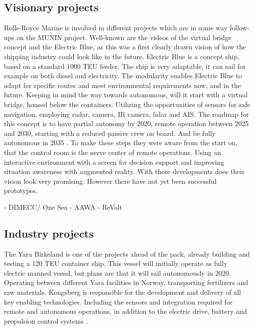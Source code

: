 \subsection{Visionary projects}
Rolls-Royce Marine is involved in different projects which are in some way follow-ups on the MUNIN project. Well-known are the videos of the virtual bridge concept and the Electric Blue, as this was a first clearly drawn vision of how the shipping industry could look like in the future. Electric Blue is a concept ship, based on a standard 1000 \ac{TEU} feeder. The ship is very adaptable, it can sail for example on both diesel and electricity. The modularity enables Electric Blue to adapt for specific routes and meet environmental requirements now, and in the future. 
Keeping in mind the way towards autonomous, will it start with a virtual bridge, housed below the containers. Utilizing the opportunities of sensors for safe navigation, employing radar, camera, IR camera, lidar and \ac{AIS}. The roadmap for this concept is to have partial autonomy by 2020, remote operation between 2025 and 2030, starting with a reduced passive crew on board. And be fully autonomous in 2035 \cite{Wilson2017}. 
To make these steps they were aware from the start on, that the control room is the nerve center of remote operations. Using an interactive environment with a screen for decision support and improving situation awareness with augmented reality. With these developments does their vision look very promising. However there have not yet been successful prototypes.

- DIMECC/ One Sea
- AAWA
- ReVolt


\subsection{Industry projects}
The Yara Birkeland is one of the projects ahead of the pack, already building and testing a 120 \ac{TEU} container ship. This vessel will initially operate as fully electric manned vessel, but plans are that it will sail autonomously in 2020. Operating between different Yara facilities in Norway, transporting fertilizers and raw materials. 
Kongsberg is responsible for the development and delivery of all key enabling technologies. Including the sensors and integration required for remote and autonomous operations, in addition to the electric drive, battery and propulsion control systems \cite{Sames2017}.

